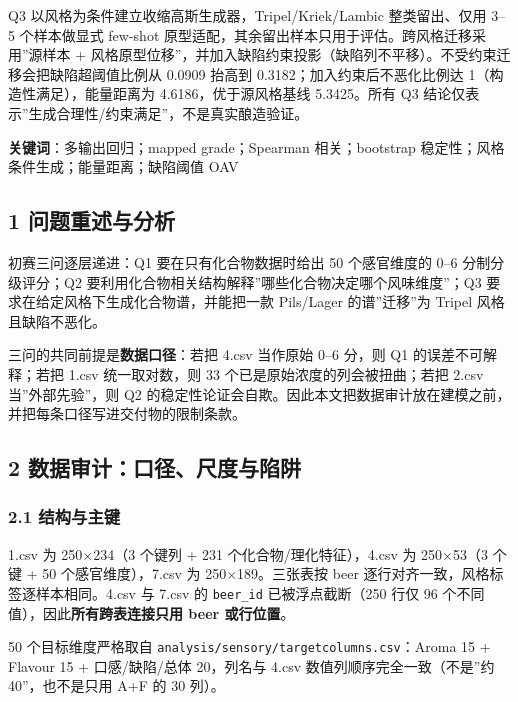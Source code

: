 \documentclass[
  UTF8]{ctexart}
\begin{document}
Q3 以风格为条件建立收缩高斯生成器，Tripel/Kriek/Lambic 整类留出、仅用
3--5 个样本做显式 few-shot
原型适配，其余留出样本只用于评估。跨风格迁移采用''源样本 +
风格原型位移''，并加入缺陷约束投影（缺陷列不平移）。不受约束迁移会把缺陷超阈值比例从
0.0909 抬高到 0.3182；加入约束后不恶化比例达 1（构造性满足），能量距离为
4.6186，优于源风格基线 5.3425。所有 Q3
结论仅表示''生成合理性/约束满足''，不是真实酿造验证。

\textbf{关键词}：多输出回归；mapped grade；Spearman 相关；bootstrap
稳定性；风格条件生成；能量距离；缺陷阈值 OAV

\subsection{1
问题重述与分析}\label{ux95eeux9898ux91cdux8ff0ux4e0eux5206ux6790}

初赛三问逐层递进：Q1 要在只有化合物数据时给出 50 个感官维度的 0--6
分制分级评分；Q2
要利用化合物相关结构解释''哪些化合物决定哪个风味维度''；Q3
要求在给定风格下生成化合物谱，并能把一款 Pils/Lager 的谱''迁移''为
Tripel 风格且缺陷不恶化。

三问的共同前提是\textbf{数据口径}：若把 4.csv 当作原始 0--6 分，则 Q1
的误差不可解释；若把 1.csv 统一取对数，则 33
个已是原始浓度的列会被扭曲；若把 2.csv 当''外部先验''，则 Q2
的稳定性论证会自欺。因此本文把数据审计放在建模之前，并把每条口径写进交付物的限制条款。

\subsection{2
数据审计：口径、尺度与陷阱}\label{ux6570ux636eux5ba1ux8ba1ux53e3ux5f84ux5c3aux5ea6ux4e0eux9677ux9631}

\subsubsection{2.1 结构与主键}\label{ux7ed3ux6784ux4e0eux4e3bux952e}

1.csv 为 250×234（3 个键列 + 231 个化合物/理化特征），4.csv 为 250×53（3
个键 + 50 个感官维度），7.csv 为 250×189。三张表按 beer
逐行对齐一致，风格标签逐样本相同。4.csv 与 7.csv 的 \texttt{beer\_id}
已被浮点截断（250 行仅 96 个不同值），因此\textbf{所有跨表连接只用 beer
或行位置}。

50 个目标维度严格取自 \texttt{analysis/sensory/targetcolumns.csv}：Aroma
15 + Flavour 15 + 口感/缺陷/总体 20，列名与 4.csv
数值列顺序完全一致（不是''约 40''，也不是只用 A+F 的 30 列）。
\end{document}
